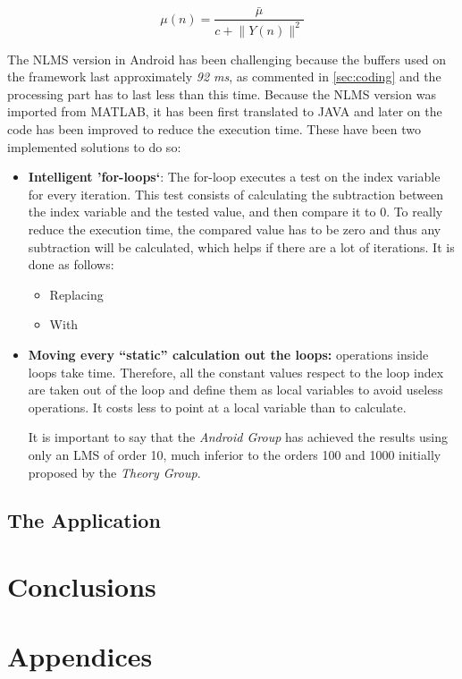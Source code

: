 \documentclass[11pt,a4paper,english]{book}  %
\theoremstyle{definition}  %
\theoremstyle{plain}  %
\theoremstyle{remark}  %
\begin{document}
		
		
	\begin{equation}
	\label{eq:nlms}
		\mu (n)=\frac{\bar{\mu}}{c+\lVert Y(n)\rVert^2}
	\end{equation}
	
	The NLMS version in Android has been challenging because the buffers used on the framework last approximately \textit{92 ms}, as commented in \ref{sec:coding} and the processing part has to last less than this time. Because the NLMS version was imported from MATLAB, it has been first translated to JAVA and later on the code has been improved to reduce the execution time. These have been two implemented solutions to do so:
	
	\begin{itemize}
	\item \textbf{Intelligent 'for-loops`}: The for-loop executes a test on the index variable for every iteration. This test consists of calculating the subtraction between the index variable and the tested value, and then compare it to $0$. To really reduce the execution time, the compared value has to be zero and thus any subtraction will be calculated, which helps if there are a lot of iterations. It is done as follows:
	
		\begin{itemize}
			\item Replacing
			
			\item With
		\end{itemize}
	
	\item \textbf{Moving every “static” calculation out the loops:}  operations inside loops take time. Therefore, all the constant values respect to the loop index are taken out of the loop and define them as local variables to avoid useless operations. It costs less to point at a local variable than to calculate.
	
	It is important to say that the \textit{Android Group} has achieved the results using only an LMS of order 10, much inferior to the orders 100 and 1000 initially proposed by the \textit{Theory Group}.
	\end{itemize}
	
	\section{The Application}

\chapter{Conclusions}

\chapter{Appendices}
\label{sec:appendix}







\end{document}
